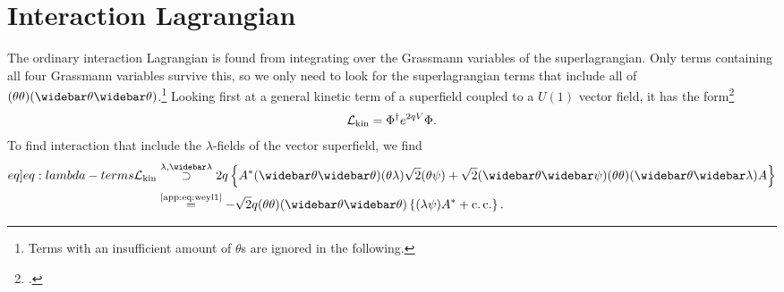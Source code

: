 \documentclass[english, notitlepage]{article}
\begin{document}
\section{Interaction Lagrangian}
    The ordinary interaction Lagrangian is found from integrating over the
    Grassmann variables of the superlagrangian. Only terms containing all four
    Grassmann variables survive this, so we only need to look for the
    superlagrangian terms that include all of
    $(\theta\theta)(\wbar\theta\wbar\theta)$.\footnote{Terms with an insufficient
        amount of $\theta$s are ignored in the following.} Looking first at a general
    kinetic term of a superfield coupled to a $U(1)$ vector field, it has the form\footcite{Binetruy:2006ad}
    \begin{align}
        {\mathcal{L}}_\text{kin} = \Phi^\dag e^{2qV} \Phi.
    \end{align}
    To find interaction that include the $\lambda$-fields of the vector superfield, we find
    \begin{align} \label[eq]{eq:lambda-terms} \nonumber
        \msub{\L}{kin} & \stackrel{\lambda, \wbar\lambda}{\supset} 2q\cclosed{ A^* (\wbar\theta\wbar\theta)(\theta\lambda) \sqrt{2} (\theta\psi) + \sqrt{2} (\wbar\theta\wbar\psi) (\theta\theta)(\wbar\theta\wbar\lambda) A } \\
                       & \stackrel{\text{\cref{app:eq:weyl1}}}{=} -\sqrt{2}q (\theta\theta)(\wbar\theta\wbar\theta) \cclosed{ (\lambda\psi)A^* + \cc }.
    \end{align}
\end{document}
